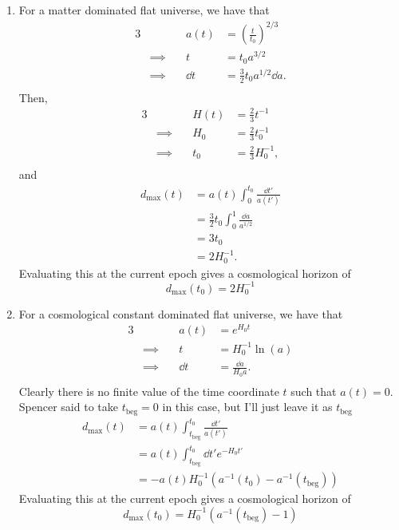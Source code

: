 \documentclass[12pt]{article}
\begin{document}
\begin{enumerate}[label=\roman*)]
    \item For a matter dominated flat universe, we have that
    \begin{alignat*}{3}
        & \quad & a(t) &= \left(\frac{t}{t_0}\right)^{2/3}  \\
        &\implies\quad & t &= t_0 a^{3/2} \\
        &\implies\quad & \dd t &= \frac{3}{2} t_0 a^{1/2}\dd a. \\
    \end{alignat*}
    Then,
    \begin{alignat*}{3}
        & \quad & H(t) &= \frac{2}{3}t^{-1}  \\
        &\implies\quad & H_0 &= \frac{2}{3}t_0^{-1} \\
        &\implies\quad & t_0 &= \frac{2}{3}H_0^{-1}, \\
    \end{alignat*}
    and
    \begin{align*}
        d_\text{max}(t) &= a(t)\int_{0}^{t_0} \frac{\dd t'}{a(t')} \\
        &= \frac{3}{2}t_0\int_0^1\frac{\dd a}{a^{1/2}} \\
        &= 3t_0 \\
        &= 2H_0^{-1}.
    \end{align*}
    Evaluating this at the current epoch gives a cosmological horizon of 
    \[ \boxed{d_\text{max}(t_0) = 2H_0^{-1}} \]

    \item For a cosmological constant dominated flat universe, we have that
    \begin{alignat*}{3}
        & \quad & a(t) &= e^{H_0t}  \\
        &\implies\quad & t &= H_0^{-1}\ln(a) \\
        &\implies\quad & \dd t &= \frac{\dd a}{H_0 a}. \\
    \end{alignat*}
    Clearly there is no finite value of the time coordinate $t$ such that $a(t) = 0$. Spencer said to take $t_\text{beg} = 0$ in this case, but I'll just leave it as $t_\text{beg}$
    \begin{align*}
        d_\text{max}(t) &= a(t)\int_{t_\text{beg}}^{t_0} \frac{\dd t'}{a(t')} \\
        &= a(t) \int_{t_\text{beg}}^{t_0} \dd t' e^{-H_0 t'} \\
        &= -a(t) H_0^{-1} \left(a^{-1}(t_0)-a^{-1}(t_\text{beg})\right)
    \end{align*}
    Evaluating this at the current epoch gives a cosmological horizon of 
    \[ \boxed{d_\text{max}(t_0) = H_0^{-1}\left(a^{-1}(t_\text{beg}) - 1\right)} \]
\end{enumerate}
\end{document}
